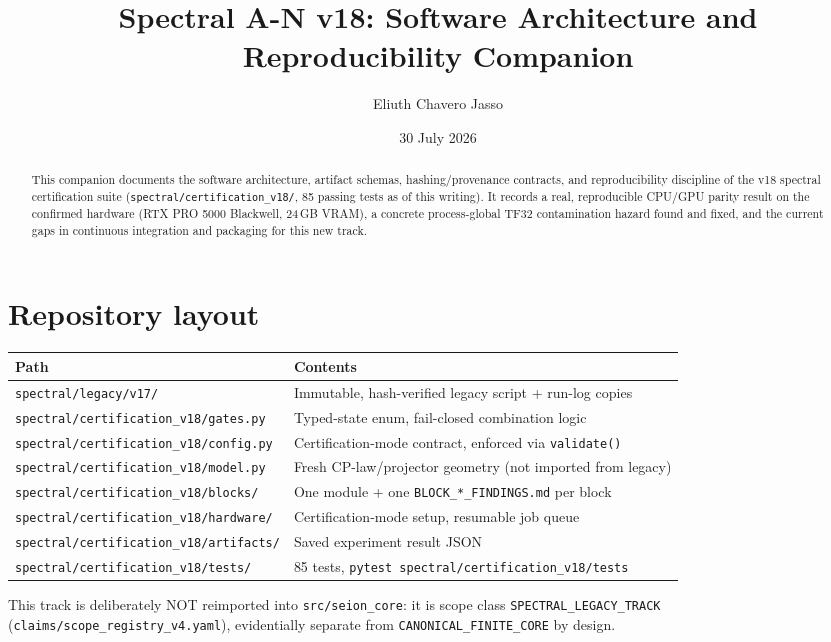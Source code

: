 \documentclass[11pt]{amsart}
\title[Spectral A-N v18: Software and Reproducibility]{Spectral A-N v18: Software Architecture and Reproducibility Companion}
\author{Eliuth Chavero Jasso}
\date{30 July 2026}
\begin{document}
\maketitle

\begin{abstract}
This companion documents the software architecture, artifact schemas,
hashing/provenance contracts, and reproducibility discipline of the v18
spectral certification suite (\texttt{spectral/certification\_v18/}, 85
passing tests as of this writing). It records a real, reproducible
CPU/GPU parity result on the confirmed hardware (RTX PRO 5000 Blackwell,
24\,GB VRAM), a concrete process-global TF32 contamination hazard found and
fixed, and the current gaps in continuous integration and packaging for
this new track.
\end{abstract}

\section{Repository layout}
\begin{center}
\small
\begin{tabular}{ll}
\toprule
Path & Contents \\
\midrule
\texttt{spectral/legacy/v17/} & Immutable, hash-verified legacy script + run-log copies \\
\texttt{spectral/certification\_v18/gates.py} & Typed-state enum, fail-closed combination logic \\
\texttt{spectral/certification\_v18/config.py} & Certification-mode contract, enforced via \texttt{validate()} \\
\texttt{spectral/certification\_v18/model.py} & Fresh CP-law/projector geometry (not imported from legacy) \\
\texttt{spectral/certification\_v18/blocks/} & One module + one \texttt{BLOCK\_*\_FINDINGS.md} per block \\
\texttt{spectral/certification\_v18/hardware/} & Certification-mode setup, resumable job queue \\
\texttt{spectral/certification\_v18/artifacts/} & Saved experiment result JSON \\
\texttt{spectral/certification\_v18/tests/} & 85 tests, \texttt{pytest spectral/certification\_v18/tests} \\
\bottomrule
\end{tabular}
\end{center}

This track is deliberately NOT reimported into \texttt{src/seion\_core}: it
is scope class \texttt{SPECTRAL\_LEGACY\_TRACK}
(\texttt{claims/scope\_registry\_v4.yaml}), evidentially separate from
\texttt{CANONICAL\_FINITE\_CORE} by design.
\end{document}
